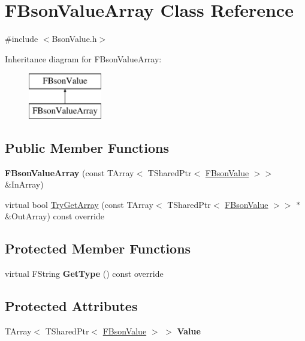 \hypertarget{class_f_bson_value_array}{}\section{F\+Bson\+Value\+Array Class Reference}
\label{class_f_bson_value_array}


{\ttfamily \#include $<$Bson\+Value.\+h$>$}

Inheritance diagram for F\+Bson\+Value\+Array\+:\begin{figure}[H]
\begin{center}
\leavevmode
\includegraphics[height=2.000000cm]{class_f_bson_value_array}
\end{center}
\end{figure}
\subsection*{Public Member Functions}
\begin{DoxyCompactItemize}
\item 
\mbox{\label{class_f_bson_value_array_a1101ddb368136fa040bd3340446e2e58}} 
{\bfseries F\+Bson\+Value\+Array} (const T\+Array$<$ T\+Shared\+Ptr$<$ \mbox{\hyperlink{class_f_bson_value}{F\+Bson\+Value}} $>$$>$ \&In\+Array)
\item 
virtual bool \mbox{\hyperlink{class_f_bson_value_array_a32f100ae460cd26a870fc04d85ffe2c5}{Try\+Get\+Array}} (const T\+Array$<$ T\+Shared\+Ptr$<$ \mbox{\hyperlink{class_f_bson_value}{F\+Bson\+Value}} $>$$>$ $\ast$\&Out\+Array) const override
\end{DoxyCompactItemize}
\subsection*{Protected Member Functions}
\begin{DoxyCompactItemize}
\item 
\mbox{\label{class_f_bson_value_array_a30a33b8e9f808aaa049df54819380175}} 
virtual F\+String {\bfseries Get\+Type} () const override
\end{DoxyCompactItemize}
\subsection*{Protected Attributes}
\begin{DoxyCompactItemize}
\item 
\mbox{\label{class_f_bson_value_array_a677992b370839f3b2b1831698b986a00}} 
T\+Array$<$ T\+Shared\+Ptr$<$ \mbox{\hyperlink{class_f_bson_value}{F\+Bson\+Value}} $>$ $>$ {\bfseries Value}
\end{DoxyCompactItemize}
